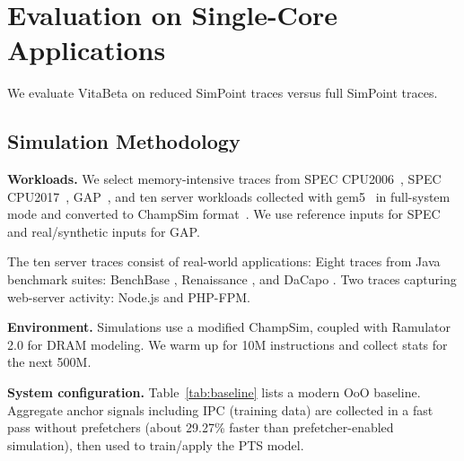 \section{Evaluation on Single-Core Applications} 
\label{evaluation_sc}
We evaluate VitaBeta on reduced SimPoint traces versus full SimPoint traces.

\subsection{Simulation Methodology}
\label{subsec:expsetup}
\textbf{Workloads.} We select memory-intensive traces from SPEC CPU2006~\cite{spec2006}, SPEC CPU2017~\cite{spec2017}, GAP~\cite{beamer2017gapbenchmarksuite}, and ten server workloads collected with gem5~\cite{gem52011} in full-system mode and converted to ChampSim format~\cite{llbp_workloads}. We use reference inputs for SPEC and real/synthetic inputs for GAP.

The ten server traces consist of real-world applications: Eight traces from Java benchmark suites: BenchBase \cite{oltp_bench}, Renaissance \cite{java_renaissance}, and DaCapo \cite{java_dacapo}. Two traces capturing web-server activity: Node.js and PHP-FPM.

\textbf{Environment.} Simulations use a modified ChampSim\cite{ChampSim}, coupled with Ramulator 2.0\cite{luo2023ramulator20modernmodular} for DRAM modeling. We warm up for 10M instructions and collect stats for the next 500M.

\textbf{System configuration.} Table~\ref{tab:baseline} lists a modern OoO baseline. Aggregate anchor signals including IPC (training data) are collected in a fast pass without prefetchers (about 29.27\% faster than prefetcher-enabled simulation), then used to train/apply the PTS model.


